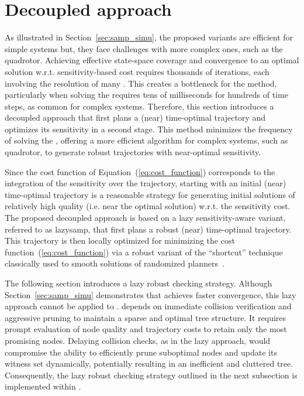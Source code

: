 \section{Decoupled approach}\label{sec:decoupled}

As illustrated in Section~\ref{sec:samp_simu}, the proposed  variants are efficient for simple systems but, they face challenges with more complex ones, such as the quadrotor. 
Achieving effective state-space coverage and convergence to an optimal solution w.r.t. sensitivity-based cost requires thousands of iterations, each involving the resolution of many . 
This creates a bottleneck for the method, particularly when solving the  requires tens of milliseconds for hundreds of time steps, as common for complex systems.
Therefore, this section introduces a decoupled approach that first plans a (near) time-optimal trajectory and optimizes its sensitivity in a second stage.
This method minimizes the frequency of solving the , offering a more efficient algorithm for complex systems, such as quadrotor, to generate robust trajectories with near-optimal sensitivity.

Since the cost function of Equation~(\ref{eq:cost_function}) corresponds to the integration of the sensitivity over the trajectory, starting with an initial (near) time-optimal trajectory is a reasonable strategy for generating initial solutions of relatively high quality (i.e. near the optimal solution) w.r.t. the sensitivity cost.
The proposed decoupled approach is based on a lazy sensitivity-aware variant, referred to as \gls{lazysamp}, that first plans a robust (near) time-optimal trajectory.
This trajectory is then locally optimized for minimizing the cost function~(\ref{eq:cost_function}) via a robust variant of the ``shortcut'' technique classically used to smooth solutions of randomized planners~\cite{cShortcut}. 

The following section introduces a lazy robust checking strategy. 
Although Section~\ref{sec:samp_simu} demonstrates that  achieves faster convergence, this lazy approach cannot be applied to . 
 depends on immediate collision verification and aggressive pruning to maintain a sparse and optimal tree structure. 
It requires prompt evaluation of node quality and trajectory costs to retain only the most promising nodes.
Delaying collision checks, as in the lazy approach, would compromise the  ability to efficiently prune suboptimal nodes and update its witness set dynamically, potentially resulting in an inefficient and cluttered tree. 
Consequently, the lazy robust checking strategy outlined in the next subsection is implemented within .

